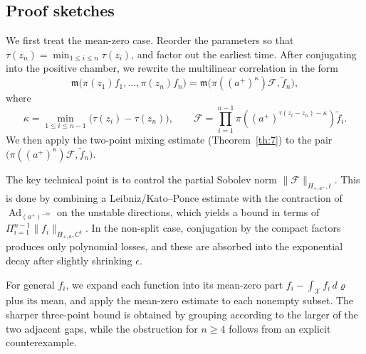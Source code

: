 \documentclass[11 pt]{amsart}
\theoremstyle{definition}
\numberwithin{equation}{section}
\DeclareMathOperator{\Ad}{Ad}
\begin{document}
\subsection{Proof sketches}

We first treat the mean-zero case. Reorder the parameters so that
$\tau(z_n)=\min_{1\le i\le n}\tau(z_i)$,
and factor out the earliest time. After conjugating into the positive chamber,
we rewrite the multilinear correlation in the form
\[
\mathfrak m\big(\pi(z_1)f_1,\dots,\pi(z_n)f_n\big)
   = \mathfrak m\big(\pi((a^+)^\kappa)\mathcal F,\widetilde f_n\big),
\]
where
\[
\kappa=\min_{1\le i\le n-1}\big(\tau(z_i)-\tau(z_n)\big),
\qquad
\mathcal F=\prod_{i=1}^{n-1}\pi((a^+)^{\tau(z_i-z_n)-\kappa})\widetilde f_i.
\]
We then apply the two-point mixing estimate (Theorem~\ref{th:7}) to the
pair \(\big(\pi((a^+)^\kappa)\mathcal F,\widetilde f_n\big)\).

The key technical point is to control the partial Sobolev norm
\(\|\mathcal F\|_{H_{+,a^+},t}\). This is done by combining a
Leibniz/Kato--Ponce estimate with the contraction of
\(\Ad_{(a^+)^{-m}}\) on the unstable directions, which yields a bound in terms of $\Pi_{i=1}^{n-1}\|f_i\|_{H_{+,a},C^t}$.
In the non-split case, conjugation by the compact factors produces only
polynomial losses, and these are absorbed into the exponential decay after
slightly shrinking \(\epsilon\).

For general \(f_i\), we expand each function into its mean-zero part
\(f_i-\int_{\mathcal X}f_i\,d\varrho\) plus its mean, and apply the
mean-zero estimate to each nonempty subset. The sharper three-point bound is
obtained by grouping according to the larger of the two adjacent gaps, while
the obstruction for \(n\ge4\) follows from an explicit counterexample.
\end{document}
